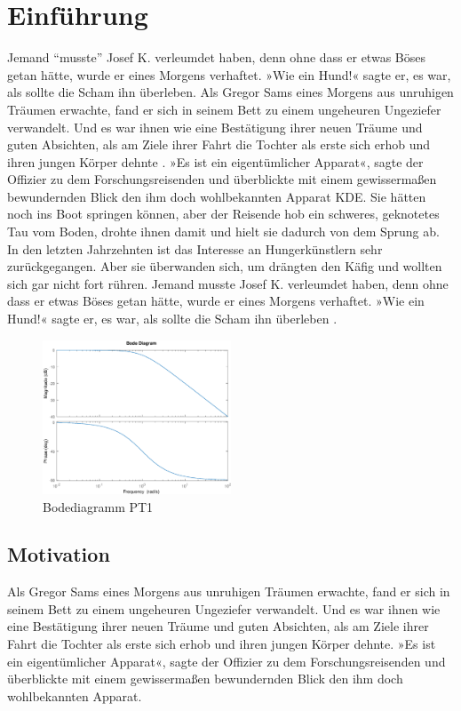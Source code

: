 \section{Einführung}
Jemand "`musste"' Josef K. verleumdet haben, denn ohne dass er etwas Böses getan hätte, wurde er eines Morgens verhaftet. »Wie ein Hund!« sagte er, es war, als sollte die Scham ihn überleben. Als Gregor Sams eines Morgens aus unruhigen Träumen erwachte, fand er sich in seinem Bett zu einem ungeheuren Ungeziefer  verwandelt. Und es war ihnen wie eine Bestätigung ihrer neuen Träume und guten Absichten, als am Ziele ihrer Fahrt die Tochter als erste sich erhob und ihren jungen Körper dehnte \cite[S.55ff]{Accardi.2010}. »Es ist ein eigentümlicher Apparat«, sagte der Offizier zu dem Forschungsreisenden und überblickte mit einem gewissermaßen bewundernden Blick den ihm doch wohlbekannten Apparat \ac{KDE}. Sie hätten noch ins Boot springen können, aber der Reisende hob ein schweres, geknotetes Tau vom Boden, drohte ihnen damit und hielt sie dadurch von dem Sprung ab. In den letzten Jahrzehnten ist das Interesse an Hungerkünstlern sehr zurückgegangen. Aber sie überwanden sich, um drängten den Käfig und wollten sich gar nicht fort rühren. Jemand musste Josef K. verleumdet haben, denn ohne dass er etwas Böses getan hätte, wurde er eines Morgens verhaftet. »Wie ein Hund!« sagte er, es war, als sollte die Scham ihn überleben \cite{Lewis.2010}.

\begin{figure}[h]
\centering \includegraphics[width=0.5\textwidth]{fig/PT1/PT1.eps}
\caption{Bodediagramm PT1}
\end{figure}

\subsection{Motivation}
Als Gregor Sams eines Morgens aus unruhigen Träumen erwachte, fand er sich in seinem Bett zu einem ungeheuren Ungeziefer verwandelt. Und es war ihnen wie eine Bestätigung ihrer neuen Träume und guten Absichten, als am Ziele ihrer Fahrt die Tochter als erste sich erhob und ihren jungen Körper dehnte. »Es ist ein eigentümlicher Apparat«, sagte der Offizier zu dem Forschungsreisenden und überblickte mit einem gewissermaßen bewundernden Blick den ihm doch wohlbekannten Apparat.


